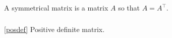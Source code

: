 \documentclass{report}
\begin{document}
\section{}

\subsection{}

A symmetrical matrix is a matrix $A$ so that $A=A^\top$.

\subsection{}

\ref{posdef} Positive definite matrix.

\chapter{}

\chapter{}
\end{document}

